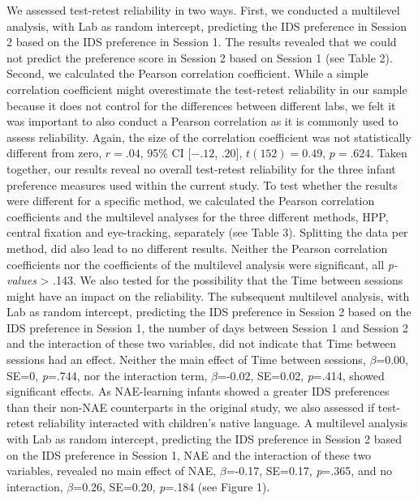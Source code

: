 \documentclass[
  english,
  man,floatsintext]{apa6}
\begin{document}
We assessed test-retest reliability in two ways. First, we conducted a multilevel analysis, with Lab as random intercept, predicting the IDS preference in Session 2 based on the IDS preference in Session 1. The results revealed that we could not predict the preference score in Session 2 based on Session 1 (see Table 2). Second, we calculated the Pearson correlation coefficient. While a simple correlation coefficient might overestimate the test-retest reliability in our sample because it does not control for the differences between different labs, we felt it was important to also conduct a Pearson correlation as it is commonly used to assess reliability. Again, the size of the correlation coefficient was not statistically different from zero, \(r = .04\), 95\% CI \([-.12\), \(.20]\), \(t(152) = 0.49\), \(p = .624\). Taken together, our results reveal no overall test-retest reliability for the three infant preference measures used within the current study.
To test whether the results were different for a specific method, we calculated the Pearson correlation coefficients and the multilevel analyses for the three different methods, HPP, central fixation and eye-tracking, separately (see Table 3). Splitting the data per method, did also lead to no different results. Neither the Pearson correlation coefficients nor the coefficients of the multilevel analysis were significant, all \emph{p-values} \textgreater{} .143.
We also tested for the possibility that the Time between sessions might have an impact on the reliability. The subsequent multilevel analysis, with Lab as random intercept, predicting the IDS preference in Session 2 based on the IDS preference in Session 1, the number of days between Session 1 and Session 2 and the interaction of these two variables, did not indicate that Time between sessions had an effect. Neither the main effect of Time between sessions, \(\beta\)=0.00, SE=0, \emph{p}=.744, nor the interaction term, \(\beta\)=-0.02, SE=0.02, \emph{p}=.414, showed significant effects.
As NAE-learning infants showed a greater IDS preferences than their non-NAE counterparts in the original study, we also assessed if test-retest reliability interacted with children's native language. A multilevel analysis with Lab as random intercept, predicting the IDS preference in Session 2 based on the IDS preference in Session 1, NAE and the interaction of these two variables, revealed no main effect of NAE, \(\beta\)=-0.17, SE=0.17, \emph{p}=.365, and no interaction, \(\beta\)=0.26, SE=0.20, \emph{p}=.184 (see Figure 1).
\end{document}
